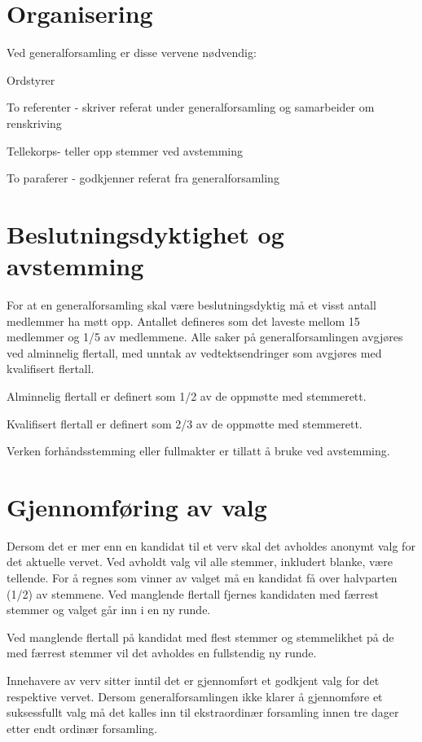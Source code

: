 \section{Organisering}
\label{sec:organisering}
Ved generalforsamling er disse vervene nødvendig: 

\begin{liste}
	\item Ordstyrer
	\item To referenter - skriver referat under generalforsamling og samarbeider om \mbox{renskriving}
	\item Tellekorps\space \space \space \space - teller opp stemmer ved avstemming
	\item To paraferer - godkjenner referat fra generalforsamling
	
\end{liste}

\newpage
\section{Beslutningsdyktighet og avstemming}

For at en generalforsamling skal være beslutningsdyktig må et visst antall medlemmer ha møtt opp. Antallet defineres som det laveste mellom 15 medlemmer og 1/5 av medlemmene. Alle saker på generalforsamlingen avgjøres ved alminnelig flertall, med unntak av vedtektsendringer som avgjøres med kvalifisert flertall.

\begin{liste}
	\item Alminnelig flertall er definert som 1/2 av de oppmøtte med stemmerett.
	\item Kvalifisert flertall er definert som 2/3 av de oppmøtte med stemmerett.
\end{liste}

Verken forhåndsstemming eller fullmakter er tillatt å bruke ved avstemming.


\section{Gjennomføring av valg}{
Dersom det er mer enn en kandidat til et verv skal det avholdes anonymt valg for det aktuelle vervet. Ved
avholdt valg vil alle stemmer, inkludert blanke, være \linebreak tellende. For å regnes som vinner av valget må en kandidat få over halvparten (1/2) av stemmene. Ved manglende flertall fjernes kandidaten med færrest stemmer \linebreak og valget går inn i en ny runde. \newline

Ved manglende flertall på kandidat med flest stemmer og stemmelikhet på de med færrest stemmer vil det
avholdes en fullstendig ny runde. \newline

Innehavere av verv sitter inntil det er gjennomført et godkjent valg for det respektive vervet. Dersom
generalforsamlingen ikke klarer å gjennomføre et suksessfullt valg må det kalles inn til ekstraordinær
forsamling innen tre dager etter endt ordinær forsamling.
}
